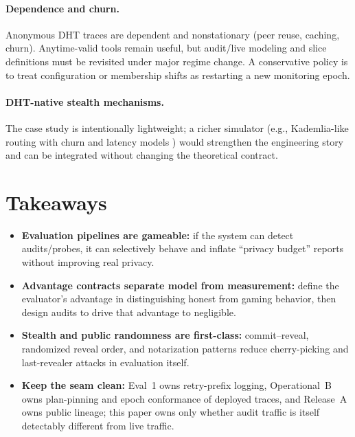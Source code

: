 \documentclass[11pt]{article}
\begin{document}
\paragraph{Dependence and churn.}
Anonymous DHT traces are dependent and nonstationary (peer reuse, caching, churn).
Anytime-valid tools remain useful, but audit/live modeling and slice definitions must be revisited under major regime change.
A conservative policy is to treat configuration or membership shifts as restarting a new monitoring epoch.

\paragraph{DHT-native stealth mechanisms.}
The case study is intentionally lightweight; a richer simulator (e.g., Kademlia-like routing with churn and latency models \cite{maymounkov2002kademlia})
would strengthen the engineering story and can be integrated without changing the theoretical contract.

\section{Takeaways}
\begin{itemize}[leftmargin=*]
\item \textbf{Evaluation pipelines are gameable:} if the system can detect audits/probes, it can selectively behave and inflate ``privacy budget'' reports without improving real privacy.
\item \textbf{Advantage contracts separate model from measurement:} define the evaluator's advantage in distinguishing honest from gaming behavior, then design audits to drive that advantage to negligible.
\item \textbf{Stealth and public randomness are first-class:} commit--reveal, randomized reveal order, and notarization patterns reduce cherry-picking and last-revealer attacks in evaluation itself.
\item \textbf{Keep the seam clean:} Eval~1 owns retry-prefix logging, Operational~B owns plan-pinning and epoch conformance of deployed traces, and Release~A owns public lineage; this paper owns only whether audit traffic is itself detectably different from live traffic.
\end{itemize}
\end{document}

